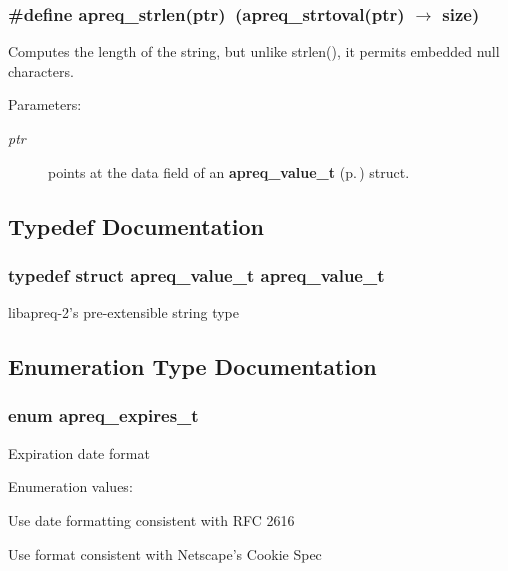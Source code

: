 \subsubsection{\setlength{\rightskip}{0pt plus 5cm}\#define apreq\_\-strlen(ptr)\ (apreq\_\-strtoval(ptr) $\rightarrow$ size)}\label{group__Utils_a35}


Computes the length of the string, but unlike strlen(), it permits embedded null characters.\begin{Desc}
\item[Parameters: ]\par
\begin{description}
\item[{\em 
ptr}]points at the data field of an {\bf apreq\_\-value\_\-t} {\rm (p.\,\pageref{structapreq__value__t})} struct. \end{description}
\end{Desc}


\subsection{Typedef Documentation}
\subsubsection{\setlength{\rightskip}{0pt plus 5cm}typedef struct apreq\_\-value\_\-t  apreq\_\-value\_\-t}\label{group__Utils_a0}


libapreq-2's pre-extensible string type 

\subsection{Enumeration Type Documentation}
\subsubsection{\setlength{\rightskip}{0pt plus 5cm}enum apreq\_\-expires\_\-t}\label{group__Utils_a38}


Expiration date format \begin{Desc}
\item[Enumeration values:]\par
\begin{description}
\item[{\em 
{\em HTTP}\label{group__Utils_a38a21}
}]Use date formatting consistent with RFC 2616 \item[{\em 
{\em NSCOOKIE}\label{group__Utils_a38a22}
}]Use format consistent with Netscape's Cookie Spec \end{description}
\end{Desc}

